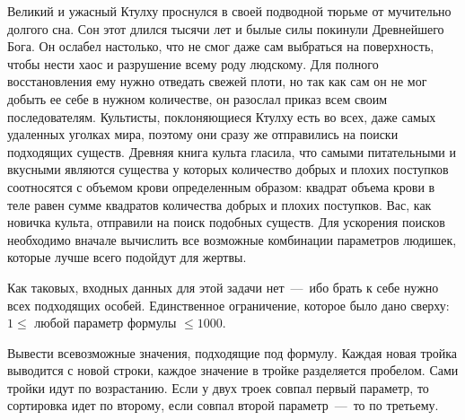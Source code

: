 Великий и ужасный Ктулху проснулся в своей подводной тюрьме от мучительно долгого сна. 
Сон этот длился тысячи лет и былые силы покинули Древнейшего Бога. 
Он ослабел настолько, что не смог даже сам выбраться на поверхность, чтобы нести хаос и разрушение всему роду людскому. 
Для полного восстановления ему нужно отведать свежей плоти, но так как сам он не мог добыть ее себе в нужном количестве, он разослал приказ всем своим последователям. 
Культисты, поклоняющиеся Ктулху есть во всех, даже самых удаленных уголках мира, поэтому они сразу же отправились на поиски подходящих существ. 
Древняя книга культа гласила, что самыми питательными и вкусными являются существа у которых количество добрых и плохих поступков соотносятся с объемом крови определенным образом: 
квадрат объема крови в теле равен сумме квадратов количества добрых и плохих поступков. 
Вас, как новичка культа, отправили на поиск подобных существ. Для ускорения поисков необходимо вначале вычислить все возможные комбинации параметров людишек, 
которые лучше всего подойдут для жертвы.

\InputFile
\noindent
Как таковых, входных данных для этой задачи нет~---~ибо брать к себе нужно всех подходящих особей. Единственное ограничение, которое было дано сверху: 
$1 \leq $ любой параметр формулы $ \leq 1000$. 

\OutputFile
\noindent

Вывести всевозможные значения, подходящие под формулу. Каждая новая тройка выводится с новой строки, каждое значение в тройке разделяется пробелом. 
Сами тройки идут по возрастанию. Если у двух троек совпал первый параметр, то сортировка идет по второму, если совпал второй параметр~---~то по третьему.

\SAMPLES
